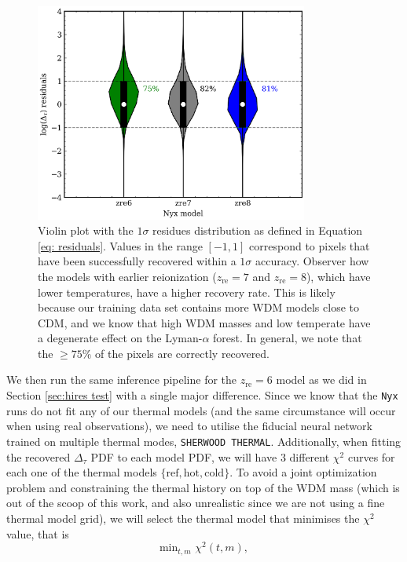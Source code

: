 \begin{figure}
    \centering
    \includegraphics[width=0.8\textwidth]{img/ML/violin_nyx.png}
    \caption{Violin plot with the $1\sigma$ residues distribution as defined in Equation \ref{eq: residuals}. Values in the range $[-1,1]$ correspond to pixels that have been successfully recovered within a $1\sigma$ accuracy. Observer how the models with earlier reionization ($z_\mathrm{re}=7$ and $z_\mathrm{re}=8$), which have lower temperatures, have a higher recovery rate. This is likely because our training data set contains more WDM models close to CDM, and we know that high WDM masses and low temperate have a degenerate effect on the Lyman-$\alpha$ forest. In general, we note that the $\geq 75 \%$ of the pixels are correctly recovered.}
    \label{fig: nyx violin}
\end{figure}
We then run the same inference pipeline for the $z_\mathrm{re}=6$ model as we did in Section \ref{sec:hires test} with a single major difference. Since we know that the \texttt{Nyx} runs do not fit any of our thermal models (and the same circumstance will occur when using real observations), we need to utilise the fiducial neural network trained on multiple thermal modes, \texttt{SHERWOOD THERMAL}. Additionally, when fitting the recovered $\Delta_\tau$ PDF to each model PDF, we will have 3 different $\chi^2$ curves for each one of the thermal models $\{\mathrm{ref}, \mathrm{hot}, \mathrm{cold} \}$. To avoid a joint optimization problem and constraining the thermal history on top of the WDM mass (which is out of the scoop of this work, and also unrealistic since we are not using a fine thermal model grid), we will select the thermal model that minimises the $\chi^2$ value, that is
\begin{equation}\label{eq: chi thermal def}
    \mathrm{min}_{t,m} \, \, \chi^2(t,m),
\end{equation}
